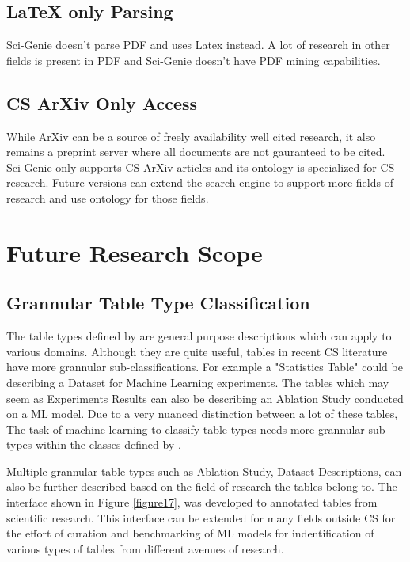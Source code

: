 \subsection{LaTeX only Parsing}
Sci-Genie doesn't parse PDF and uses Latex instead. A lot of research in other fields is present in PDF and Sci-Genie doesn't have PDF mining capabilities. 

\subsection{CS ArXiv Only Access}
While ArXiv can be a source of freely availability well cited research, it also remains a preprint server where all documents are not gauranteed to be cited. Sci-Genie only supports CS ArXiv articles and its ontology is specialized for CS research. Future versions can extend the search engine to support more fields of research and use ontology for those fields. 

\section{Future Research Scope}
\label{conclusion:future-scope}
\subsection{Grannular Table Type Classification}
\label{conclusion:future-scope:type-class}

The table types defined by \cite{kim2012scientific} are general purpose descriptions which can apply to various domains. Although they are quite useful, tables in recent CS literature have more grannular sub-classifications. For example a "Statistics Table" could be describing a Dataset for Machine Learning experiments. The tables which may seem as Experiments Results can also be describing an Ablation Study conducted on a ML model. Due to a very nuanced distinction between a lot of these tables, The task of machine learning to classify table types needs more grannular sub-types within the classes defined by \cite{kim2012scientific}. 

Multiple grannular table types such as Ablation Study, Dataset Descriptions, can also be further described based on the field of research the tables belong to. The interface shown in Figure \ref{figure17}, was developed to annotated tables from scientific research. This interface can be extended for many fields outside CS for the effort of curation and benchmarking of ML models for indentification of various types of tables from different avenues of research. 

